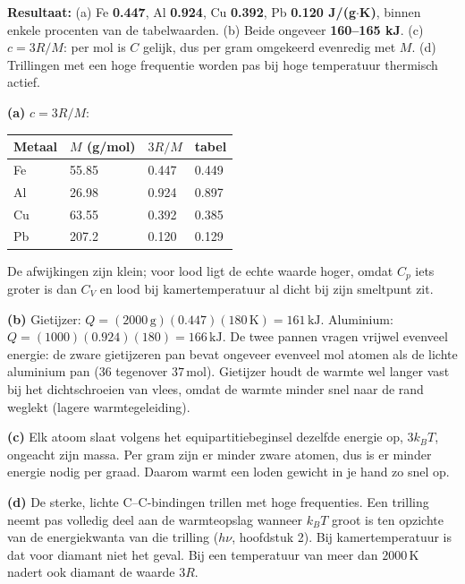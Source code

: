 \begin{oplossing}
\textbf{Resultaat:} (a) Fe \textbf{0.447}, Al \textbf{0.924}, Cu \textbf{0.392}, Pb \textbf{0.120 J/(g\ensuremath{\cdot{}}K)}, binnen enkele procenten van de tabelwaarden. (b) Beide ongeveer \textbf{160--165 kJ}. (c) \(c = 3R/M\): per mol is \(C\) gelijk, dus per gram omgekeerd evenredig met \(M\). (d) Trillingen met een hoge frequentie worden pas bij hoge temperatuur thermisch actief.

\textbf{(a)} \(c = 3R/M\):

\begin{center}
\begin{tabular}{llll}
\toprule
Metaal & \(M\) (g/mol) & \(3R/M\) & tabel \\
\midrule
Fe & 55.85 & 0.447 & 0.449 \\
Al & 26.98 & 0.924 & 0.897 \\
Cu & 63.55 & 0.392 & 0.385 \\
Pb & 207.2 & 0.120 & 0.129 \\
\bottomrule
\end{tabular}
\end{center}

De afwijkingen zijn klein; voor lood ligt de echte waarde hoger, omdat \(C_p\) iets groter is dan \(C_V\) en lood bij kamertemperatuur al dicht bij zijn smeltpunt zit.

\textbf{(b)} Gietijzer: \(Q = (2000\,\mathrm{g})(0.447)(180\,\mathrm{K}) = 161\,\mathrm{kJ}\). Aluminium: \(Q = (1000)(0.924)(180) = 166\,\mathrm{kJ}\). De twee pannen vragen vrijwel evenveel energie: de zware gietijzeren pan bevat ongeveer evenveel mol atomen als de lichte aluminium pan (\(36\) tegenover \(37\,\mathrm{mol}\)). Gietijzer houdt de warmte wel langer vast bij het dichtschroeien van vlees, omdat de warmte minder snel naar de rand weglekt (lagere warmtegeleiding).

\textbf{(c)} Elk atoom slaat volgens het equipartitiebeginsel dezelfde energie op, \(3k_BT\), ongeacht zijn massa. Per gram zijn er minder zware atomen, dus is er minder energie nodig per graad. Daarom warmt een loden gewicht in je hand zo snel op.

\textbf{(d)} De sterke, lichte C--C-bindingen trillen met hoge frequenties. Een trilling neemt pas volledig deel aan de warmteopslag wanneer \(k_BT\) groot is ten opzichte van de energiekwanta van die trilling (\(h\nu\), hoofdstuk 2). Bij kamertemperatuur is dat voor diamant niet het geval. Bij een temperatuur van meer dan \(2000\,\mathrm{K}\) nadert ook diamant de waarde \(3R\).
\end{oplossing}

